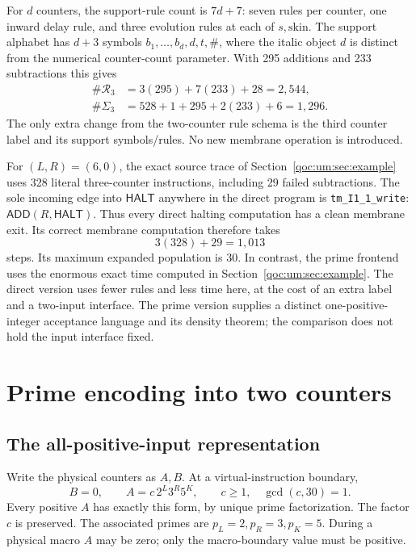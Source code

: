 \documentclass[11pt,letterpaper]{article}
\theoremstyle{definition}
\theoremstyle{remark}
\newcommand{\file}[1]{\nolinkurl{#1}}
\newcommand{\HALT}{\mathsf{HALT}}
\newcommand{\ADD}{\mathsf{ADD}}
\newcommand{\skin}{\mathrm{skin}}
\newcommand{\trap}{\#}
\begin{document}
For $d$ counters, the support-rule count is $7d+7$: seven rules per counter, one inward delay rule, and three evolution rules at each of $s,\skin$. The support alphabet has $d+3$ symbols $b_1,\ldots,b_d,d,t,\trap$, where the italic object $d$ is distinct from the numerical counter-count parameter. With 295 additions and 233 subtractions this gives
\begin{align*}
 \#\mathcal R_3&=3(295)+7(233)+28=2{,}544,\\
 \#\Sigma_3&=528+1+295+2(233)+6=1{,}296.
\end{align*}
The only extra change from the two-counter rule schema is the third counter label and its support symbols/rules. No new membrane operation is introduced.

For $(L,R)=(6,0)$, the exact source trace of Section~\ref{qoc:um:sec:example} uses 328 literal three-counter instructions, including 29 failed subtractions. The sole incoming edge into $\HALT$ anywhere in the direct program is \file{tm_I1_1_write}: $\ADD(R,\HALT)$. Thus every direct halting computation has a clean membrane exit. Its correct membrane computation therefore takes
\[
 3(328)+29=1{,}013
\]
steps. Its maximum expanded population is 30. In contrast, the prime frontend uses the enormous exact time computed in Section~\ref{qoc:um:sec:example}. The direct version uses fewer rules and less time here, at the cost of an extra label and a two-input interface. The prime version supplies a distinct one-positive-integer acceptance language and its density theorem; the comparison does not hold the input interface fixed.

\section{Prime encoding into two counters}\label{qoc:um:sec:prime}
\subsection{The all-positive-input representation}
Write the physical counters as $A,B$. At a virtual-instruction boundary,
\begin{equation}\label{qoc:um:eq:prime}
 B=0,\qquad A=c\,2^L3^R5^K,\qquad c\geq1,\quad\gcd(c,30)=1.
\end{equation}
Every positive $A$ has exactly this form, by unique prime factorization. The factor $c$ is preserved. The associated primes are $p_L=2,p_R=3,p_K=5$. During a physical macro $A$ may be zero; only the macro-boundary value must be positive.
\end{document}
